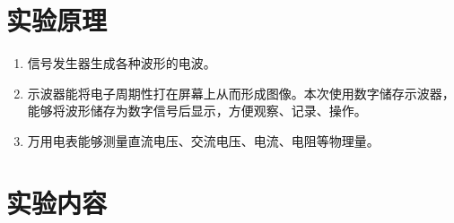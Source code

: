 \documentclass[11pt]{article}
\begin{document}
\section{实验原理}
\begin{enumerate}
    \item 信号发生器生成各种波形的电波。
    \item 示波器能将电子周期性打在屏幕上从而形成图像。本次使用数字储存示波器，能够将波形储存为数字信号后显示，方便观察、记录、操作。
    \item 万用电表能够测量直流电压、交流电压、电流、电阻等物理量。
\end{enumerate}


\section{实验内容}
\end{document}
